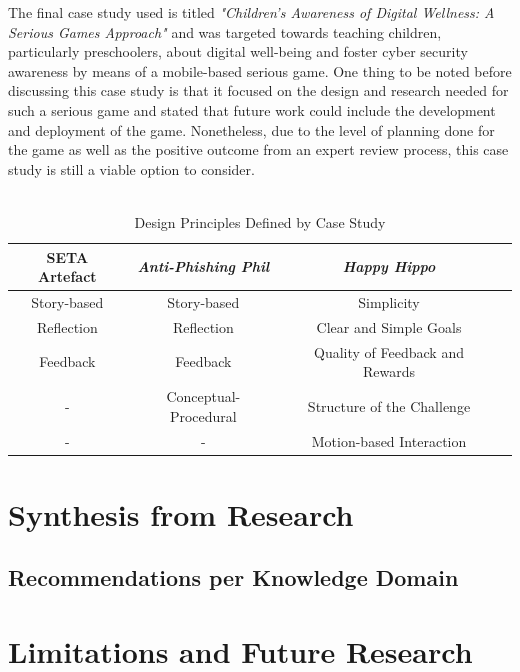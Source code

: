 \documentclass[conference]{IEEEtran}
\begin{document}
The final case study used is titled \textit{"Children’s Awareness of Digital Wellness: A Serious Games Approach"} and was targeted towards teaching children, particularly preschoolers, about digital well-being and foster cyber security awareness by means of a mobile-based serious game\cite{allers2021children}. One thing to be noted before discussing this case study is that it focused on the design and research needed for such a serious game and stated that future work could include the development and deployment of the game\cite{allers2021children}. Nonetheless, due to the level of planning done for the game as well as the positive outcome from an expert review process, this case study is still a viable option to consider.
\\\\







\begin{table}[htbp]
\caption{Design Principles Defined by Case Study \cite{Dincelli2020,Sheng2007,allers2021children}}
\begin{adjustwidth}{-0.0cm}{}
\begin{tabular}{|c|c|c|c|}
\hline

\textbf{SETA Artefact} & \textbf{\textit{Anti-Phishing Phil}}& \textbf{\textit{Happy Hippo}} \\
\hline
Story-based	& Story-based 			& Simplicity  \\
Reflection	& Reflection			& Clear and Simple Goals  \\
Feedback	& Feedback 				& Quality of Feedback and Rewards  \\
	-		& Conceptual-Procedural	& Structure of the Challenge  \\
	-		& 		-				& Motion-based Interaction  \\
\hline

\end{tabular}
\label{tab1}
\end{adjustwidth}
\end{table}





\section{Synthesis from Research}
\subsection{Recommendations per Knowledge Domain}


\section{Limitations and Future Research}

\printbibliography
\end{document}
